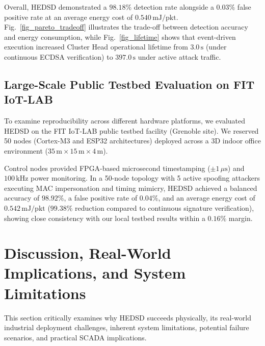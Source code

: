 \documentclass[conference]{IEEEtran}
\begin{document}
\begin{enumerate}
Overall, HEDSD demonstrated a $98.18\%$ detection rate alongside a $0.03\%$ false positive rate at an average energy cost of $0.540\,\text{mJ/pkt}$. Fig.~\ref{fig_pareto_tradeoff} illustrates the trade-off between detection accuracy and energy consumption, while Fig.~\ref{fig_lifetime} shows that event-driven execution increased Cluster Head operational lifetime from $3.0\,\text{s}$ (under continuous ECDSA verification) to $397.0\,\text{s}$ under active attack traffic.

\subsection{Large-Scale Public Testbed Evaluation on FIT IoT-LAB}
\label{subsec:fit_iot_lab}
To examine reproducibility across different hardware platforms, we evaluated HEDSD on the FIT IoT-LAB public testbed facility (Grenoble site). We reserved 50 nodes (Cortex-M3 and ESP32 architectures) deployed across a 3D indoor office environment ($35\,\text{m} \times 15\,\text{m} \times 4\,\text{m}$).

Control nodes provided FPGA-based microsecond timestamping ($\pm 1\,\mu\text{s}$) and $100\,\text{kHz}$ power monitoring. In a 50-node topology with 5 active spoofing attackers executing MAC impersonation and timing mimicry, HEDSD achieved a balanced accuracy of $98.92\%$, a false positive rate of $0.04\%$, and an average energy cost of $0.542\,\text{mJ/pkt}$ ($99.38\%$ reduction compared to continuous signature verification), showing close consistency with our local testbed results within a $0.16\%$ margin.

\section{Discussion, Real-World Implications, and System Limitations}
\label{sec_discussion}

This section critically examines why HEDSD succeeds physically, its real-world industrial deployment challenges, inherent system limitations, potential failure scenarios, and practical SCADA implications.


\end{enumerate}
\end{document}
